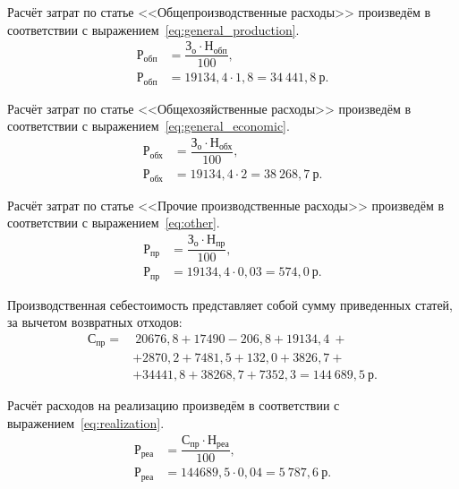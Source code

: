 Расчёт затрат по статье <<Общепроизводственные расходы>>
произведём в соответствии с выражением~\ref{eq:general_production}.
\begin{align}
  \label{eq:general_production}
  \text{Р}_{\text{обп}} &= \dfrac{\text{З}_{\text{о}} \cdot
    \text{Н}_{\text{обп}}}{100}, \\
  \text{Р}_{\text{обп}} &= 19134{,}4 \cdot 1{,}8 =
    34~441{,}8 \: \text{р.} \nonumber
\end{align}

Расчёт затрат по статье <<Общехозяйственные расходы>>
произведём в соответствии с выражением~\ref{eq:general_economic}.
\begin{align}
  \label{eq:general_economic}
  \text{Р}_{\text{обх}} &= \dfrac{\text{З}_{\text{о}} \cdot
    \text{Н}_{\text{обх}}}{100}, \\
  \text{Р}_{\text{обх}} &= 19134{,}4 \cdot 2 =
    38~268{,}7 \: \text{р.} \nonumber
\end{align}

Расчёт затрат по статье <<Прочие производственные расходы>>
произведём в соответствии с выражением~\ref{eq:other}.
\begin{align}
  \label{eq:other}
  \text{Р}_{\text{пр}} &= \dfrac{\text{З}_{\text{о}} \cdot
    \text{Н}_{\text{пр}}}{100}, \\
  \text{Р}_{\text{пр}} &= 19134{,}4 \cdot 0{,}03 =
    574{,}0 \: \text{р.} \nonumber
\end{align}

Производственная себестоимость представляет собой сумму приведенных статей, за
вычетом возвратных отходов:
\begin{align}
  \text{С}_{\text{пр}} =&~20676{,}8 + 17490 - 206{,}8 + 19134{,}4~ + \\ \nonumber
    &+ 2870{,}2 + 7481{,}5 + 132{,}0 + 3826{,}7 +             \\ \nonumber
    &+ 34441{,}8 + 38268{,}7 + 7352{,}3 = 144~689{,}5 \: \text{р.} \nonumber
\end{align}

Расчёт расходов на реализацию произведём в соответствии с
выражением~\ref{eq:realization}.
\begin{align}
  \label{eq:realization}
  \text{Р}_{\text{реа}} &= \dfrac{\text{С}_{\text{пр}} \cdot
    \text{Н}_{\text{реа}}}{100}, \\
  \text{Р}_{\text{реа}} &= 144689{,}5 \cdot 0{,}04 =
    5~787{,}6 \: \text{р.} \nonumber
\end{align}

